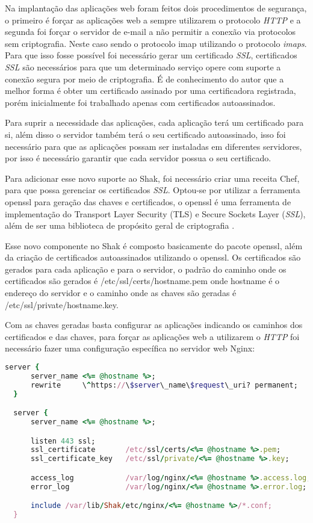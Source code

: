 Na implantação das aplicações web foram feitos dois procedimentos de segurança, o primeiro
é forçar as aplicações web a sempre utilizarem o protocolo \textit{HTTP} e a segunda foi forçar o
servidor de e-mail a não permitir a conexão via protocolos sem criptografia. Neste
caso sendo o protocolo imap utilizando o protocolo \textit{imaps}. Para que isso fosse possível
foi necessário gerar um certificado \textit{SSL}, certificados \textit{SSL} são necessários para
que um determinado serviço opere com suporte a conexão segura por meio de criptografia.
É de conhecimento do autor que a melhor forma é obter um certificado assinado
por uma certificadora registrada, porém inicialmente foi trabalhado apenas com certificados
autoassinados.

Para suprir a necessidade das aplicações, cada aplicação terá um certificado para
si, além disso o servidor também terá o seu certificado autoassinado, isso foi necessário
para que as aplicações possam ser instaladas em diferentes servidores, por
isso é necessário garantir que cada servidor possua o seu certificado. 

Para adicionar esse novo suporte ao Shak, foi necessário criar uma receita Chef,
para que possa gerenciar os certificados \textit{SSL}. Optou-se por utilizar a ferramenta
openssl para geração das chaves e certificados, o openssl é uma ferramenta de
implementação do Transport Layer Security (TLS) e Secure Sockets Layer (\textit{SSL}),
além de ser uma biblioteca de propósito geral de criptografia \cite{openssl}.

Esse novo componente no Shak é composto basicamente do pacote openssl, além da criação
de certificados autoassinados utilizando o openssl. Os certificados são gerados 
para cada aplicação e para o servidor, o padrão do caminho onde os certificados são
gerados é /etc/ssl/certs/hostname.pem onde hostname é o endereço do servidor
e o caminho onde as chaves são geradas é /etc/ssl/private/hostname.key.

Com as chaves geradas basta configurar as aplicações indicando os caminhos dos certificados
e das chaves, para forçar as aplicações web a utilizarem o \textit{HTTP} foi necessário fazer
uma configuração específica no servidor web Nginx:


\begin{lstlisting}[language=Ruby,label=dice_index,caption={Exemplo de arquivo de configuração do Nginx para aplicações web no shak}]
  server {
      server_name <%= @hostname %>;
      rewrite     \^https://\$server\_name\$request\_uri? permanent;
  }

  server {
      server_name <%= @hostname %>;

      listen 443 ssl;
      ssl_certificate       /etc/ssl/certs/<%= @hostname %>.pem;
      ssl_certificate_key   /etc/ssl/private/<%= @hostname %>.key;

      access_log            /var/log/nginx/<%= @hostname %>.access.log;
      error_log             /var/log/nginx/<%= @hostname %>.error.log;

      include /var/lib/Shak/etc/nginx/<%= @hostname %>/*.conf;
  }
\end{lstlisting}


